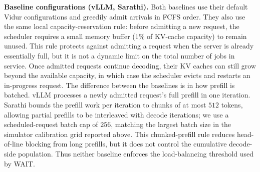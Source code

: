 \textbf{Baseline configurations (vLLM, Sarathi).} Both baselines use their default Vidur configurations and greedily admit arrivals in FCFS order. They also use the same local capacity-reservation rule: before admitting a new request, the scheduler requires a small memory buffer ($1\%$ of KV-cache capacity) to remain unused. This rule protects against admitting a request when the server is already essentially full, but it is not a dynamic limit on the total number of jobs in service. Once admitted requests continue decoding, their KV caches can still grow beyond the available capacity, in which case the scheduler evicts and restarts an in-progress request. The difference between the baselines is in how prefill is batched. vLLM processes a newly admitted request's full prefill in one iteration. Sarathi bounds the prefill work per iteration to chunks of at most $512$ tokens, allowing partial prefills to be interleaved with decode iterations; we use a scheduled-request batch cap of $256$, matching the largest batch size in the simulator calibration grid reported above. This chunked-prefill rule reduces head-of-line blocking from long prefills, but it does not control the cumulative decode-side population. Thus neither baseline enforces the load-balancing threshold used by WAIT.

